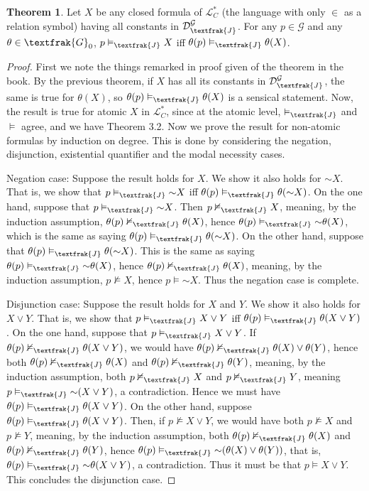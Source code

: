 \documentclass{article}
\newcommand*{\oldneg}{\mathord{\sim}}
\theoremstyle{definition}
\newtheorem{theorem}{Theorem}[section]
\begin{document}
\begin{theorem}
Let $X$ be any closed formula of $\mathcal{L}^*_C$ (the language with only $\in$ as a relation symbol) having 
all constants in $\mathcal{D}^\mathcal{G}_\textfrak{J}$. For any $p\in\mathcal{G}$ and any $\theta\in\textfrak{G}_0$, 
$p\vDash_\textfrak{J} X$ iff $\theta(p)\vDash_\textfrak{J}\theta(X)$.
\end{theorem}

\begin{proof}
First we note the things remarked in proof given of the theorem in the book. By the previous theorem, if $X$ has all its 
constants in $\mathcal{D}^\mathcal{G}_\textfrak{J}$, the same is true for $\theta(X)$, so 
$\theta(p)\vDash_\textfrak{J}\theta(X)$ is a sensical statement. Now, the result is true for atomic $X$ in 
$\mathcal{L}^*_C$, since at the atomic level, $\vDash_\textfrak{J}$ and $\vDash$ agree, and we 
have Theorem 3.2. Now we prove the result for non-atomic formulas by induction on degree. This is done by considering 
the negation, disjunction, existential quantifier and the modal necessity cases.

Negation case: Suppose the result holds for $X$. We show it also holds for $\oldneg X$. That is, we show that 
$p\vDash_\textfrak{J}\oldneg X$ iff $\theta(p)\vDash_\textfrak{J}\theta(\oldneg X)$. On the one hand, suppose that 
$p\vDash_\textfrak{J}\oldneg X$. Then $p\nvDash_\textfrak{J} X$, meaning, by the induction assumption, 
$\theta(p)\nvDash_\textfrak{J}\theta(X)$, hence 
$\theta(p)\vDash_\textfrak{J}\oldneg\theta(X)$, which is the same as saying 
$\theta(p)\vDash_\textfrak{J}\theta(\oldneg X)$. On the other hand, suppose that 
$\theta(p)\vDash_\textfrak{J}\theta(\oldneg X)$. This is the same as saying 
$\theta(p)\vDash_\textfrak{J}\oldneg\theta(X)$, hence 
$\theta(p)\nvDash_\textfrak{J}\theta(X)$, meaning, by the induction assumption,
$p\nvDash X$, hence $p\vDash\oldneg X$. Thus the negation case is complete.

Disjunction case: Suppose the result holds for $X$ and $Y$. We show it also holds for $X\vee Y$. That is, we show that 
$p\vDash_\textfrak{J} X\vee Y$ iff $\theta(p)\vDash_\textfrak{J}\theta(X\vee Y)$. On the one hand, suppose that 
$p\vDash_\textfrak{J} X\vee Y$. If $\theta(p)\nvDash_\textfrak{J}\theta(X\vee Y)$, we would have 
$\theta(p)\nvDash_\textfrak{J}\theta(X)\vee\theta(Y)$, hence both 
$\theta(p)\nvDash_\textfrak{J}\theta(X)$ and $\theta(p)\nvDash_\textfrak{J}\theta(Y)$, meaning, by the induction assumption, 
both $p\nvDash_\textfrak{J} X$ and $p\nvDash_\textfrak{J} Y$, meaning $p\vDash_\textfrak{J}\oldneg (X\vee Y)$, a contradiction. Hence we must have 
$\theta(p)\vDash_\textfrak{J}\theta(X\vee Y)$. On the other hand, suppose
$\theta(p)\vDash_\textfrak{J}\theta(X\vee Y)$. Then, if $p\nvDash X\vee Y$, we would have 
both $p\nvDash X$ and $p\nvDash Y$, meaning, by the induction assumption, both 
$\theta(p)\nvDash_\textfrak{J}\theta(X)$ and $\theta(p)\nvDash_\textfrak{J}\theta(Y)$, hence
$\theta(p)\vDash_\textfrak{J}\oldneg(\theta(X)\vee\theta(Y))$, that is, 
$\theta(p)\vDash_\textfrak{J}\oldneg\theta(X\vee Y)$, a contradiction. Thus it must be that 
$p\vDash X\vee Y$. This concludes the disjunction case.


\end{proof}
\end{document}
